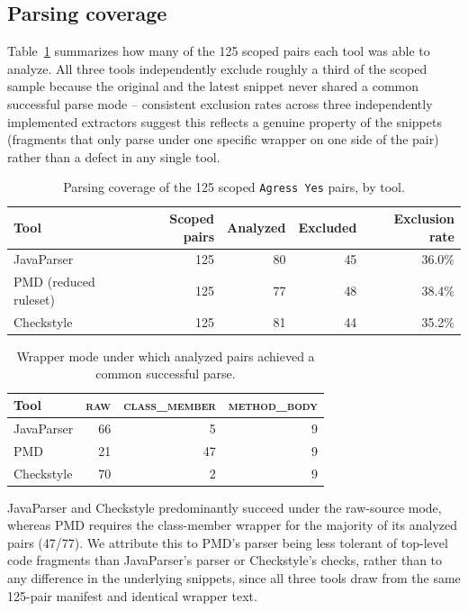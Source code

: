 \subsection{Parsing coverage}
\label{sec:before-after-coverage}

Table~\ref{tab:ba-coverage} summarizes how many of the 125 scoped pairs
each tool was able to analyze. All three tools independently exclude
roughly a third of the scoped sample because the original and the latest
snippet never shared a common successful parse mode -- consistent
exclusion rates across three independently implemented extractors suggest
this reflects a genuine property of the snippets (fragments that only
parse under one specific wrapper on one side of the pair) rather than a
defect in any single tool.

\begin{table}[htbp]
\centering
\caption{Parsing coverage of the 125 scoped \texttt{Agress Yes} pairs, by
tool.}
\label{tab:ba-coverage}
\begin{tabular}{lrrrr}
\toprule
Tool & Scoped pairs & Analyzed & Excluded & Exclusion rate \\
\midrule
JavaParser            & 125 & 80 & 45 & 36.0\% \\
PMD (reduced ruleset) & 125 & 77 & 48 & 38.4\% \\
Checkstyle            & 125 & 81 & 44 & 35.2\% \\
\bottomrule
\end{tabular}
\end{table}

\begin{table}[htbp]
\centering
\caption{Wrapper mode under which analyzed pairs achieved a common
successful parse.}
\label{tab:ba-parse-mode}
\begin{tabular}{lrrr}
\toprule
Tool & \textsc{raw} & \textsc{class\_member} & \textsc{method\_body} \\
\midrule
JavaParser & 66 & 5  & 9 \\
PMD        & 21 & 47 & 9 \\
Checkstyle & 70 & 2  & 9 \\
\bottomrule
\end{tabular}
\end{table}

JavaParser and Checkstyle predominantly succeed under the raw-source
mode, whereas PMD requires the class-member wrapper for the majority of
its analyzed pairs (47/77). We attribute this to PMD's parser being less
tolerant of top-level code fragments than JavaParser's parser or
Checkstyle's checks, rather than to any difference in the underlying
snippets, since all three tools draw from the same 125-pair manifest and
identical wrapper text.

